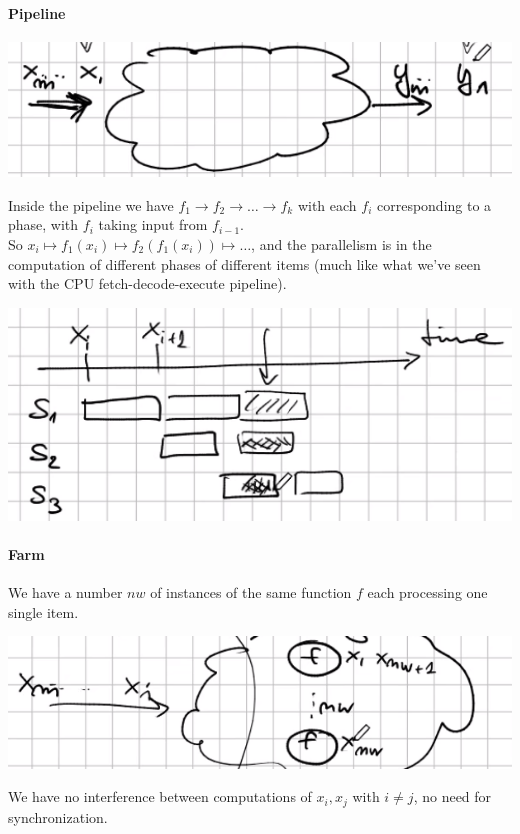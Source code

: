 \documentclass[10pt]{report}
\begin{document}
\paragraph{Pipeline}
\begin{center}
	\includegraphics[scale=0.5]{3.png}
\end{center}
Inside the pipeline we have $f_1\rightarrow f_2\rightarrow\ldots\rightarrow f_k$ with each $f_i$ corresponding to a phase, with $f_i$ taking input from $f_{i-1}$.\\
So $x_i\mapsto f_1(x_i)\mapsto f_2(f_1(x_i))\mapsto \ldots$, and the parallelism is in the computation of different phases of different items (much like what we've seen with the CPU fetch-decode-execute pipeline).
\begin{center}
	\includegraphics[scale=0.5]{4.png}
\end{center}
\paragraph{Farm}
We have a number $nw$ of instances of the same function $f$ each processing one single item.
\begin{center}
	\includegraphics[scale=0.5]{5.png}
\end{center}
We have no interference between computations of $x_i,x_j$ with $i\neq j$, no need for synchronization.
\end{document}
